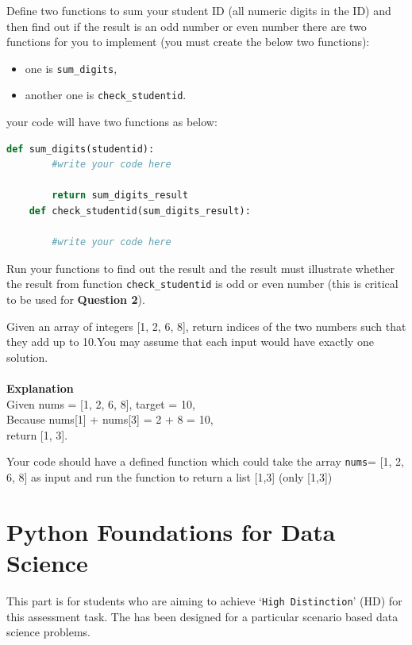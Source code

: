 \documentclass[a4paper]{article}
\begin{document}
    
    \begin{answer}[Question 1.7]
    Define two functions to sum your student ID (all numeric digits in the ID) and then find out if the result is an odd number or even number
    there are two functions for you to implement (you must create the below two functions):
    \begin{itemize}
        \item one is \texttt{sum_digits},
        \item another one is \texttt{check_studentid}.
    \end{itemize}
    your code will have two functions as below:

    \begin{lstlisting}[language=Python]
    def sum_digits(studentid):
        #write your code here

        return sum_digits_result
    def check_studentid(sum_digits_result):

        #write your code here
    \end{lstlisting}
   Run your functions to find out the result and the result must illustrate whether the result from function \texttt{check_studentid} is odd or even number (this is critical to be used for \textbf{Question 2}).
    \end{answer}
    
    
    \begin{answer}[Question 1.8]
    Given an array of integers [1, 2, 6, 8], return indices of the two numbers such that they add up to 10.You may assume that each input would have exactly one solution. \\
    \\
    \textbf{Explanation} \\
    Given nums = [1, 2, 6, 8], target = 10, \\
    Because nums[1] + nums[3] = 2 + 8 = 10, \\
    return [1, 3].

    Your code should have a defined function which could take the array \texttt{nums}= [1, 2, 6, 8] as input and run the function to return a list [1,3] (only [1,3])
    \end{answer}
    
    \part{Python Foundations for Data Science}\label{sec:part2}

    This part is for students who are aiming to 
    achieve `\texttt{High Distinction}' (HD) for this assessment task. The  has been designed for a particular scenario based data science problems.
\end{document}
